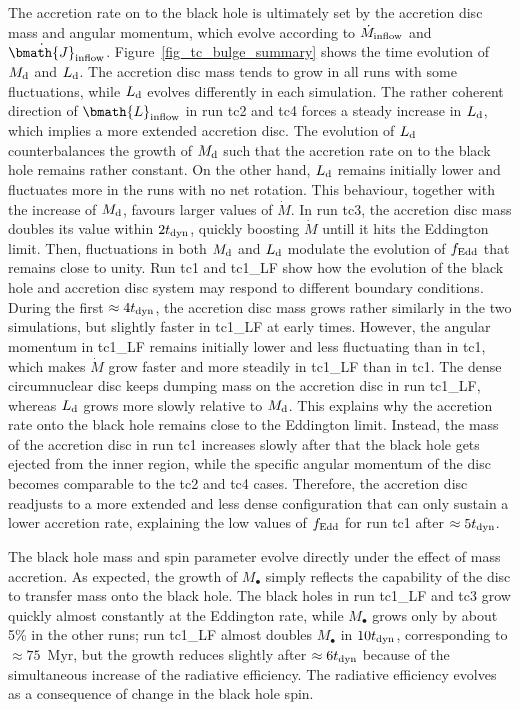 \documentclass[a4paper,fleqn,usenatbib]{mnras}
\begin{document}
The accretion rate on to the black hole is ultimately set by the accretion disc mass and angular momentum, which evolve according to $\dot{M}_{\rm inflow}$ and $\dot{\bmath{J}}_{\rm inflow}$.
Figure~\ref{fig_tc_bulge_summary} shows the time evolution of $M_{\rm d}$ and $L_{\rm d}$.
The accretion disc mass tends to grow in all runs with some fluctuations, while $L_{\rm d}$ evolves differently in each simulation.
The rather coherent direction of $\bmath{L}_{\rm inflow}$ in run tc2 and tc4 forces a steady increase in $L_{\rm d}$, which implies a more extended accretion disc.
The evolution of $L_{\rm d}$ counterbalances the growth of $M_{\rm d}$ such that the accretion rate on to the black hole remains rather constant.
On the other hand, $L_{\rm d}$ remains initially lower and fluctuates more in the runs with no net rotation.
This behaviour, together with the increase of $M_{\rm d}$, favours larger values of $\dot{M}$.
In run tc3, the accretion disc mass doubles its value within $2 t_{\rm dyn}$, quickly boosting $\dot{M}$ untill it hits the Eddington limit.
Then, fluctuations in both $M_{\rm d}$ and $L_{\rm d}$ modulate the evolution of $f_{\rm Edd}$ that remains close to unity.
Run tc1 and tc1\_LF show how the evolution of the black hole and accretion disc system may respond to different boundary conditions.
During the first $\approx 4 t_{\rm dyn}$, the accretion disc mass grows rather similarly in the two simulations, but slightly faster in tc1\_LF at early times.
However, the angular momentum in tc1\_LF remains initially lower and less fluctuating than in tc1, which makes $\dot{M}$ grow faster and more steadily in tc1\_LF than in tc1.
The dense circumnuclear disc keeps dumping mass on the accretion disc in run tc1\_LF, whereas $L_{\rm d}$ grows more slowly relative to $M_{\rm d}$.
This explains why the accretion rate onto the black hole remains close to the Eddington limit.
Instead, the mass of the accretion disc in run tc1 increases slowly after that the black hole gets ejected from the inner region, while the specific angular momentum of the disc becomes comparable to the tc2 and tc4 cases.
Therefore, the accretion disc readjusts to a more extended and less dense configuration that can only sustain a lower accretion rate, explaining the low values of $f_{\rm Edd}$ for run tc1 after $\approx 5 t_{\rm dyn}$.

The black hole mass and spin parameter evolve directly under the effect of mass accretion.
As expected, the growth of $M_{\bullet}$ simply reflects the capability of the disc to transfer mass onto the black hole.
The black holes in run tc1\_LF and tc3 grow quickly almost constantly at the Eddington rate, while $M_{\bullet}$ grows only by about 5\% in the other runs; run tc1\_LF almost doubles $M_{\bullet}$ in $10 t_{\rm dyn}$, corresponding to $\approx 75$~Myr, but the growth reduces slightly after $\approx 6 t_{\rm dyn}$ because of the simultaneous increase of the radiative efficiency.
The radiative efficiency evolves as a consequence of change in the black hole spin.
\end{document}
